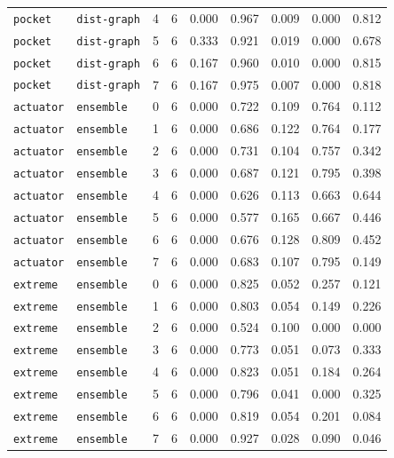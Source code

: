 \documentclass{article}
\begin{document}
\begin{center}
\begin{tabular}{lllcccccc}
\texttt{pocket} & \texttt{dist-graph} & 4 & 6 & 0.000 & 0.967 & 0.009 & 0.000 & 0.812 \\
\texttt{pocket} & \texttt{dist-graph} & 5 & 6 & 0.333 & 0.921 & 0.019 & 0.000 & 0.678 \\
\texttt{pocket} & \texttt{dist-graph} & 6 & 6 & 0.167 & 0.960 & 0.010 & 0.000 & 0.815 \\
\texttt{pocket} & \texttt{dist-graph} & 7 & 6 & 0.167 & 0.975 & 0.007 & 0.000 & 0.818 \\
\texttt{actuator} & \texttt{ensemble} & 0 & 6 & 0.000 & 0.722 & 0.109 & 0.764 & 0.112 \\
\texttt{actuator} & \texttt{ensemble} & 1 & 6 & 0.000 & 0.686 & 0.122 & 0.764 & 0.177 \\
\texttt{actuator} & \texttt{ensemble} & 2 & 6 & 0.000 & 0.731 & 0.104 & 0.757 & 0.342 \\
\texttt{actuator} & \texttt{ensemble} & 3 & 6 & 0.000 & 0.687 & 0.121 & 0.795 & 0.398 \\
\texttt{actuator} & \texttt{ensemble} & 4 & 6 & 0.000 & 0.626 & 0.113 & 0.663 & 0.644 \\
\texttt{actuator} & \texttt{ensemble} & 5 & 6 & 0.000 & 0.577 & 0.165 & 0.667 & 0.446 \\
\texttt{actuator} & \texttt{ensemble} & 6 & 6 & 0.000 & 0.676 & 0.128 & 0.809 & 0.452 \\
\texttt{actuator} & \texttt{ensemble} & 7 & 6 & 0.000 & 0.683 & 0.107 & 0.795 & 0.149 \\
\texttt{extreme} & \texttt{ensemble} & 0 & 6 & 0.000 & 0.825 & 0.052 & 0.257 & 0.121 \\
\texttt{extreme} & \texttt{ensemble} & 1 & 6 & 0.000 & 0.803 & 0.054 & 0.149 & 0.226 \\
\texttt{extreme} & \texttt{ensemble} & 2 & 6 & 0.000 & 0.524 & 0.100 & 0.000 & 0.000 \\
\texttt{extreme} & \texttt{ensemble} & 3 & 6 & 0.000 & 0.773 & 0.051 & 0.073 & 0.333 \\
\texttt{extreme} & \texttt{ensemble} & 4 & 6 & 0.000 & 0.823 & 0.051 & 0.184 & 0.264 \\
\texttt{extreme} & \texttt{ensemble} & 5 & 6 & 0.000 & 0.796 & 0.041 & 0.000 & 0.325 \\
\texttt{extreme} & \texttt{ensemble} & 6 & 6 & 0.000 & 0.819 & 0.054 & 0.201 & 0.084 \\
\texttt{extreme} & \texttt{ensemble} & 7 & 6 & 0.000 & 0.927 & 0.028 & 0.090 & 0.046 \\
\bottomrule
\end{tabular}
\end{center}
\end{document}
